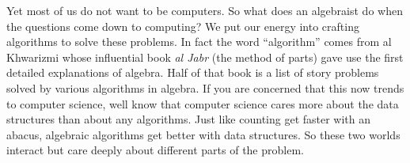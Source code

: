 Yet most of us do not want to be computers.  So what does an algebraist do 
when the questions come down to computing?  We put our energy into crafting 
algorithms to solve these problems.  In fact the word ``algorithm'' comes 
from al Khwarizmi whose influential book \emph{al Jabr} (the method of parts)
gave use the first detailed explanations of algebra.  Half of that book 
is a list of story problems solved by various algorithms in algebra.
If you are concerned that this now trends to computer science, well know that 
computer science cares more about the data structures than about any algorithms.
Just like counting get faster with an abacus, algebraic algorithms get better 
with data structures.  So these two worlds interact but care deeply about 
different parts of the problem.